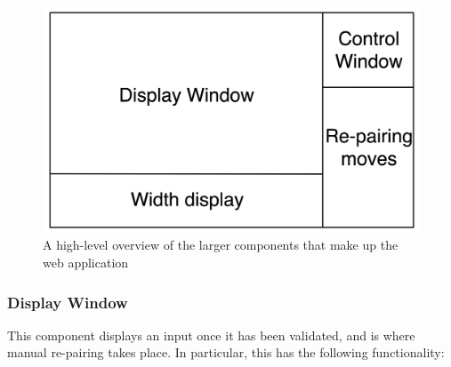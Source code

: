 \begin{figure}[H]
    \centering
    \includegraphics[scale=0.16]{./figures/webBreakdown.png}
    \caption{A high-level overview of the larger components that make up the web application}
\end{figure}

\subsubsection{Display Window}
This component displays an input once it has been validated, and is where manual re-pairing takes place. In particular, this has the following functionality:

